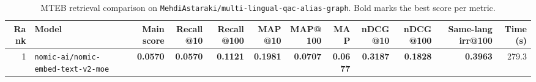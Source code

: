 \begin{table}[t]
\centering
\small
\begin{tabular}{r l r r r r r r r r r r}
\hline
Rank & Model & Main score & Recall@10 & Recall@100 & MAP@10 & MAP@100 & MAP & nDCG@10 & nDCG@100 & Same-lang irr@100 & Time (s) \\
\hline
1 & \texttt{nomic-ai/nomic-embed-text-v2-moe} & \textbf{0.0570} & \textbf{0.0570} & \textbf{0.1121} & \textbf{0.1981} & \textbf{0.0707} & \textbf{0.0677} & \textbf{0.3187} & \textbf{0.1828} & \textbf{0.3963} & 279.3 \\
\hline
\end{tabular}
\caption{MTEB retrieval comparison on \texttt{MehdiAstaraki/multi-lingual-qac-alias-graph}. Bold marks the best score per metric.}
\label{tab:mteb-model-comparison}
\end{table}
